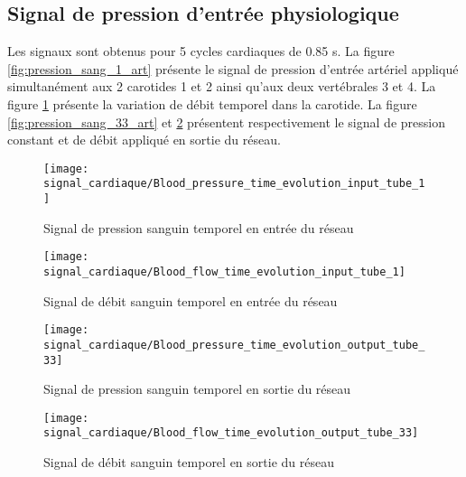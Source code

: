 \documentclass[french]{report}
\begin{document}
\subsection{Signal de pression d'entrée physiologique}

Les signaux sont obtenus pour 5 cycles cardiaques de 0.85 s. La figure \ref{fig:pression_sang_1_art} présente le signal de pression d'entrée artériel appliqué simultanément aux 2 carotides 1 et 2 ainsi qu'aux deux vertébrales 3 et 4. La figure \ref{fig:débit_sang_1_art} présente la variation de débit temporel dans la carotide.
La figure \ref{fig:pression_sang_33_art} et \ref{fig:débit_sang_33_art} présentent respectivement le signal de pression constant et de débit appliqué en sortie du réseau.

\begin{figure}
  \begin{minipage}{0.5\linewidth}
    \centering
    \texttt{[image: signal\_cardiaque/Blood\_pressure\_time\_evolution\_input\_tube\_1]}
    \caption{Signal de pression sanguin temporel en entrée du réseau}
    \label{fig:pression_sang_1_art}
  \end{minipage}
  \hspace{0.5cm}
  \begin{minipage}{0.5\linewidth}
    \centering
    \texttt{[image: signal\_cardiaque/Blood\_flow\_time\_evolution\_input\_tube\_1]}
    \caption{Signal de débit sanguin temporel en entrée du réseau}
    \label{fig:débit_sang_1_art}
  \end{minipage}
\end{figure}

\begin{figure}
  \begin{minipage}[b]{0.5\linewidth}
    \centering
    \texttt{[image: signal\_cardiaque/Blood\_pressure\_time\_evolution\_output\_tube\_33]}
    \caption{Signal de pression sanguin temporel en sortie du réseau}
    \label{fig:pression_sang_33_art}
  \end{minipage}
  \hspace{0.5cm}
  \begin{minipage}[b]{0.5\linewidth}
    \centering
    \texttt{[image: signal\_cardiaque/Blood\_flow\_time\_evolution\_output\_tube\_33]}
    \caption{Signal de débit sanguin temporel en sortie du réseau}
    \label{fig:débit_sang_33_art}
  \end{minipage}
\end{figure}
\end{document}
